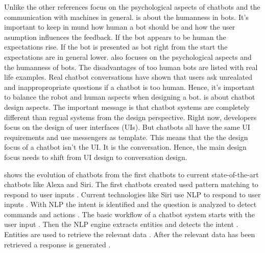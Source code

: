 Unlike the other references \citet{folstad2017chatbots, brandtzaeg2018chatbots, GO2019304}
focus on the psychological aspects of chatbots and the communication with machines in general.
\citet{GO2019304} is about the humanness in bots.
It's important to keep in mund how human a bot should be and how the user asumption influences 
the feedback.
If the bot appears to be human the expectations rise.
If the bot is presented as bot right from the start the expectations are in general lower.
\citet{brandtzaeg2018chatbots} also focuses on the psychological aspects and the humanness of bots.
The disadvantages of too human bots are listed with real life examples. 
Real chatbot conversations have shown that users ask unrealated and inappropropriate questions 
if a chatbot is too human. 
Hence, it's important to balance the robot and human aspects when designing a bot.
\citet{dutta2017developing} is about chatbot design aspects.
The important message is that chatbot systems are completely different than regual systems from 
the design perspective.
Right now, developers focus on the design of user interfaces (UIs).
But chatbots all have the same UI requirements and use messengers as template.
This means that the the design focus of a chatbot isn't the UI.
It is the conversation.
Hence, the main design focus needs to shift from UI design to conversation design.


\citet{deshpande2017survey} shows the evolution of chatbots from the first chatbots to 
current state-of-the-art chatbots like Alexa and Siri.
The first chatbots created used pattern matching to respond to user inputs \cite{deshpande2017survey}.
Current technologies like Siri use NLP to respond to user inputs \cite{deshpande2017survey}.
With NLP the intent is identified and the question is analyzed to detect commands and actions \cite{deshpande2017survey}.
The basic workflow of a chatbot system starts with the user input \cite{deshpande2017survey}. 
Then the NLP engine extracts entities and detects the intent \cite{deshpande2017survey}.
Entities are used to retrieve the relevant data \cite{deshpande2017survey}.
After the relevant data has been retrieved a response is generated \cite{deshpande2017survey}.

